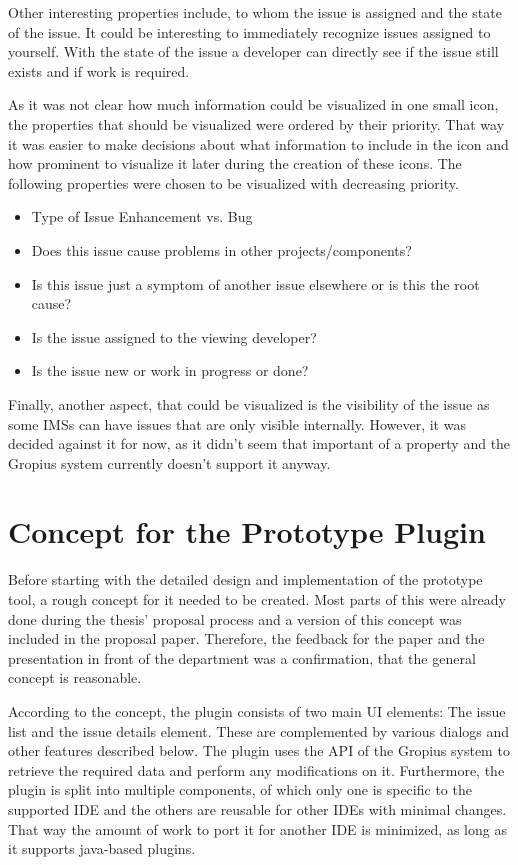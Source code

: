 Other interesting properties include, to whom the issue is assigned and the state of the issue.
It could be interesting to immediately recognize issues assigned to yourself.
With the state of the issue a developer can directly see if the issue still exists and if work is required.

As it was not clear how much information could be visualized in one small icon, 
the properties that should be visualized were ordered by their priority.
That way it was easier to make decisions about what information to include in the icon and how prominent to visualize it later during the creation of these icons.
The following properties were chosen to be visualized with decreasing priority.
\begin{itemize}
	\item Type of Issue
	\subitem Enhancement vs. Bug
	\item Does this issue cause problems in other projects/components?
	\item Is this issue just a symptom of another issue elsewhere or is this the root cause?
	\item Is the issue assigned to the viewing developer?
	\item Is the issue new or work in progress or done?
\end{itemize}
Finally, another aspect, that could be visualized is the visibility of the issue as some \glspl{IMS} can have issues that are only visible internally.
However, it was decided against it for now, as it didn't seem that important of a property and the Gropius system currently doesn't support it anyway.

\section{Concept for the Prototype Plugin}
\label{sec:ch3:s3}
Before starting with the detailed design and implementation of the prototype tool, a rough concept for it needed to be created.
Most parts of this were already done during the thesis' proposal process and a version of this concept was included in the proposal paper.
Therefore, the feedback for the paper and the presentation in front of the department was a confirmation, that the general concept is reasonable.

According to the concept, the plugin consists of two main \gls{UI} elements: The issue list and the issue details element.
These are complemented by various dialogs and other features described below.
The plugin uses the \gls{API} of the \gls{Gropius} system to retrieve the required data and perform any modifications on it.
Furthermore, the plugin is split into multiple components, 
of which only one is specific to the supported \gls{IDE} 
and the others are reusable for other \glspl{IDE} with minimal changes.
That way the amount of work to port it for another \gls{IDE} is minimized,
as long as it supports \gls{java}-based plugins.

